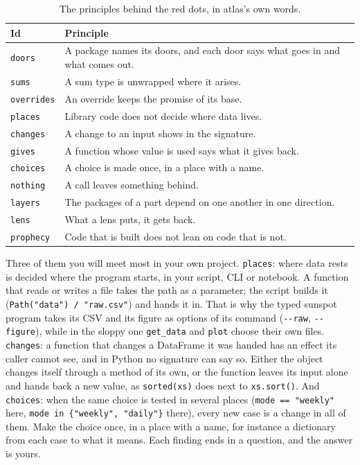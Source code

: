\documentclass[12pt, a4paper]{article}
\theoremstyle{definition}
\theoremstyle{remark}
\begin{document}
\begin{table}[H]
\centering
\small
\begin{tabularx}{\textwidth}{@{}l X@{}}
\toprule
\textbf{Id} & \textbf{Principle} \\
\midrule
\texttt{doors} & A package names its doors, and each door says what goes in and what comes out. \\
\texttt{sums} & A sum type is unwrapped where it arises. \\
\texttt{overrides} & An override keeps the promise of its base. \\
\texttt{places} & Library code does not decide where data lives. \\
\texttt{changes} & A change to an input shows in the signature. \\
\texttt{gives} & A function whose value is used says what it gives back. \\
\texttt{choices} & A choice is made once, in a place with a name. \\
\texttt{nothing} & A call leaves something behind. \\
\texttt{layers} & The packages of a part depend on one another in one direction. \\
\texttt{lens} & What a lens puts, it gets back. \\
\texttt{prophecy} & Code that is built does not lean on code that is not. \\
\bottomrule
\end{tabularx}
\caption{The principles behind the red dots, in atlas's own words.}
\label{tab:atlas-principles}
\end{table}

Three of them you will meet most in your own project. \texttt{places}: where data rests is decided where the program starts, in your script, CLI or notebook. A function that reads or writes a file takes the path as a parameter; the script builds it (\texttt{Path("data") / "raw.csv"}) and hands it in. That is why the typed sunspot program takes its CSV and its figure as options of its command (\texttt{-{}-raw}, \texttt{-{}-figure}), while in the sloppy one \texttt{get\_data} and \texttt{plot} choose their own files. \texttt{changes}: a function that changes a DataFrame it was handed has an effect its caller cannot see, and in Python no signature can say so. Either the object changes itself through a method of its own, or the function leaves its input alone and hands back a new value, as \texttt{sorted(xs)} does next to \texttt{xs.sort()}. And \texttt{choices}: when the same choice is tested in several places (\texttt{mode == "weekly"} here, \texttt{mode in \{"weekly", "daily"\}} there), every new case is a change in all of them. Make the choice once, in a place with a name, for instance a dictionary from each case to what it means. Each finding ends in a question, and the answer is yours.
\end{document}
